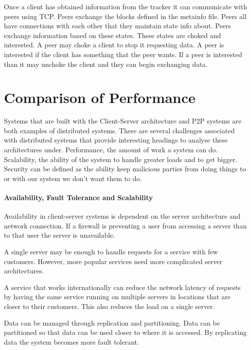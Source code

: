 \documentclass[11pt]{amsart}
\begin{document}
Once a client has obtained information from the tracker it can communicate with peers using TCP. Peers exchange the blocks defined in the metainfo file. Peers all have connections with each other that they maintain state info about. Peers exchange information based on these states.
\indent 
These states are choked and interested. A peer may choke a client to stop it requesting data. A peer is interested if the client has something that the peer wants. If a peer is interested than it may unchoke the client and they can begin exchanging data.

\part{Comparison of Performance}

Systems that are built with the Client-Server architecture and P2P systems are both examples of distributed systems. There are several challenges associated with distributed systems that provide interesting headings to analyse these architectures under. Performance, the amount of work a system can do. Scalability, the ability of the system to handle greater loads and to get bigger. Security can be defined as the ability keep malicious parties from doing things to or with our system we don't want them to do. 

\subsection{Availability, Fault Tolerance and Scalability}

\indent 

Availability in client-server systems is dependent on the server architecture and network connection. If a firewall is preventing a user from accessing a server than to that user the server is unavailable.

\indent A single server may be enough to handle requests for a service with few customers. However, more popular services need more complicated server architectures.

\indent A service that works internationally can reduce the network latency of requests by having the same service running on multiple servers in locations that are closer to their customers. This also reduces the load on a single server.

\indent Data can be managed through replication and partitioning. Data can be partitioned so that data can be used closer to where it is accessed. By replicating data the system becomes more fault tolerant.
\end{document}
